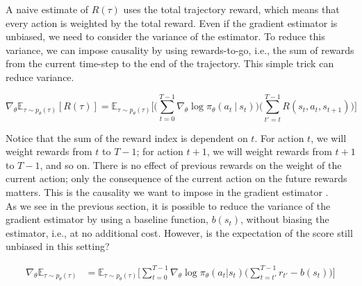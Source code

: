 \noindent {} A naive estimate of $R(\tau)$ uses the total trajectory reward, which means that every action is weighted by the total reward. Even if the gradient estimator is unbiased, we need to consider the variance of the estimator.
To reduce this variance, we can impose causality by using rewards-to-go, i.e., the sum of rewards from the current time-step to the end of the trajectory. This simple trick can reduce variance. 

\begin{equation}\label{eqn:reinforce-gradient-reward-to-go}
    \nabla_{\theta}\mathbb{E}_{\tau\sim p_{\theta}(\tau)}[R(\tau)] = \mathbb{E}_{\tau\sim p_{\theta}(\tau)}\bigg[\bigg(\sum_{t=0}^{T-1} \nabla_{\theta}\log \pi_{\theta} (a_t~|~s_t)\bigg) \bigg(\sum_{t'=t}^{T-1}R(s_{t}, a_{t}, s_{t+1})\bigg)\bigg] 
\end{equation}

\noindent Notice that the sum of the reward index is dependent on $t$. For action $t$, we  will weight rewards from $t$ to $T-1$; for action $t+1$, we will weight rewards from $t+1$ to $T-1$, and so on. There is no effect of previous rewards on the weight of the current action; only the consequence of the current action on the future rewards matters. This is the causality we want to impose in the gradient estimator . \\

\noindent As we see in the previous section, it is possible to reduce the
variance of the gradient estimator by using a baseline function, $b(s_{t})$, without biasing the estimator, i.e., at no additional cost. However, is the expectation of the score still unbiased in this setting? 

\begin{equation}\label{eqn:reinforce-gradient-estimator-baseline}
    \begin{split}
        \nabla_{\theta}\mathbb{E}_{\tau\sim p_{\theta}(\tau)} &= \mathbb{E}_{\tau\sim p_{\theta}(\tau)} \bigg[\sum_{t=0}^{T-1}\nabla_{\theta}\log\pi_{\theta}(a_{t}|s_{t}) \bigg( \sum_{t=t'}^{T-1} r_{t'}-b(s_{t}) \bigg) \bigg]
    \end{split}
\end{equation}

